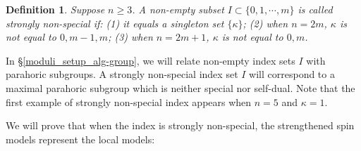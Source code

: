\documentclass[pdflatex,sn-mathphys-num]{sn-jnl}%
\theoremstyle{thmstyleone}%
\theoremstyle{thmstyletwo}%
\numberwithin{equation}{subsection}
\theoremstyle{thmstylethree}%
\newtheorem{definition}[subsubsection]{Definition}%
\begin{document}
\begin{definition}\label{intro_back:general-max}
Suppose $n\geq 3$. A non-empty subset $I\subset\{0,1,\cdots,m\}$ is called \emph{strongly non-special} if: (1) it equals a singleton set $\{\kappa\}$; (2) when $n=2m$, $\kappa$ is not equal to $0,m-1,m$; (3) when $n=2m+1$, $\kappa$ is not equal to $0,m$.
\end{definition}

In \S \ref{moduli_setup_alg-group}, we will relate non-empty index sets $I$ with parahoric subgroups. A strongly non-special index set $I$ will correspond to a maximal parahoric subgroup which is neither special nor self-dual.
Note that the first example of strongly non-special index appears when $n=5$ and $\kappa=1$.

We will prove that when the index is strongly non-special,
the strengthened spin models represent the local models:
\end{document}
